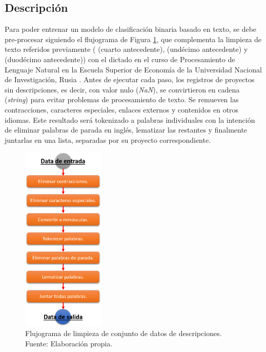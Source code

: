 \subsection{Descripción}
Para poder entrenar un modelo de clasificación binaria basado en texto, se debe pre-procesar siguiendo el flujograma de Figura \ref{4:fig32}, que complementa la limpieza de texto referidos previamente (\citeauthor{pr_yuan2016textanalytics} (cuarto antecedente), \citeauthor{pr_chen2019keywords_crowdfunding} (undécimo antecedente) y \citeauthor{pr_mitra2014phrases} (duodécimo antecedente)) con el dictado en el curso de Procesamiento de Lenguaje Natural en la Escuela Superior de Economía de la Universidad Nacional de Investigación, Rusia \parencite{tec_zimovnov2018text_preprocessing}. Antes de ejecutar cada paso, los registros de proyectos sin descripciones, es decir, con valor nulo (\textit{NaN}), se convirtieron en cadena (\textit{string}) para evitar problemas de procesamiento de texto. Se remueven las contracciones, caracteres especiales, enlaces externos y contenidos en otros idiomas. Este resultado será tokenizado a palabras individuales con la intención de eliminar palabras de parada en inglés, lematizar las restantes y finalmente juntarlas en una lista, separadas por su proyecto correspondiente.

\begin{figure}[!ht]
	\begin{center}
		\includegraphics[width=0.35\textwidth]{4/figures/description_data_clean.png}
		\caption{Flujograma de limpieza de conjunto de datos de descripciones. Fuente: Elaboración propia.}
		\label{4:fig32}
	\end{center}
\end{figure}

